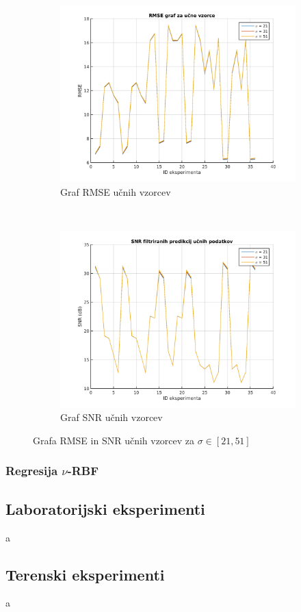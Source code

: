 \begin{figure}[htb]
\centering
\begin{subfigure}[t]{0.45\columnwidth}
\includegraphics[width=\columnwidth]{./Slike/sigma-rmse21-51.png}
\caption{Graf RMSE učnih vzorcev}
\label{fig:sigma-rmse21-51}
\end{subfigure}
~
\begin{subfigure}[t]{0.45\columnwidth}
\includegraphics[width=\columnwidth]{./Slike/sigma-snr21-51.png}
\caption{Graf SNR  učnih vzorcev}
\label{fig:sigma-snr21-51}
\end{subfigure}
\caption{Grafa RMSE in SNR učnih vzorcev za \mbox{$\sigma \in [21,51]$}}
\label{fig:sigma21-51}
\end{figure}


\subsubsection{Regresija \texorpdfstring{$\nu$}{nu}-RBF}



\subsection{Laboratorijski eksperimenti}
a

\subsection{Terenski eksperimenti}
a
